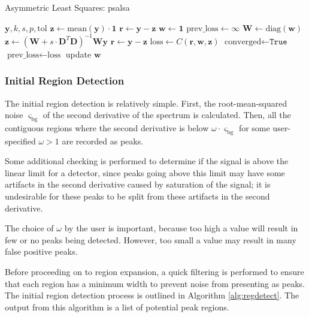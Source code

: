 \documentclass{article}
\begin{document}
\begin{algorithm}[ht]
\caption{Asymmetric Least Squares: psalsa}\label{alg:psalsa}
\begin{algorithmic}
\Require $ \bm{y}, k, s, p, \text{tol}$
\State $\bm{z} \gets \text{mean}(\bm{y}) \cdot \bm{1}$
\State $\bm{r} \gets \bm{y} - \bm{z}$
\State $\bm{w} \gets \bm{1}$ 
\State $\text{prev\_loss} \gets \infty$
\State $\mathbf{W} \gets \text{diag}(\bm{w})$ 
\State $\bm{z} \gets (\mathbf{W} + s \cdot \mathbf{D}^T\mathbf{D})^{-1}\mathbf{W}\bm{y}$ 
\State $\bm{r} \gets \bm{y} - \bm{z}$ 
\State $\text{loss} \gets C(\bm{r},\bm{w},\bm{z})$ 
 
    \State $\text{converged} \gets \texttt{True}$
\EndIf
\State $\text{prev\_loss} \gets \text{loss}$
\State update $\bm{w}$ 
\EndWhile
\end{algorithmic}
\end{algorithm}

\subsubsection{Initial Region Detection}
The initial region detection is relatively simple. First, the root-mean-squared noise $\varsigma_{\text{bg}}$ of the second derivative of the spectrum is calculated. Then, all the contiguous regions where the second derivative is below $\omega \cdot \varsigma_{\text{bg}}$ for some user-specified $\omega >1$ are recorded as peaks. 

Some additional checking is performed to determine if the signal is above the linear limit for a detector, since peaks going above this limit may have some artifacts in the second derivative caused by saturation of the signal; it is undesirable for these peaks to be split from these artifacts in the second derivative.

The choice of $\omega$ by the user is important, because too high a value will result in few or no peaks being detected. However, too small a value may result in many false positive peaks.

Before proceeding on to region expansion, a quick filtering is performed to ensure that each region has a minimum width to prevent noise from presenting as peaks. The initial region detection process is outlined in Algorithm \ref{alg:regdetect}. The output from this algorithm is a list of potential peak regions.
\end{document}
